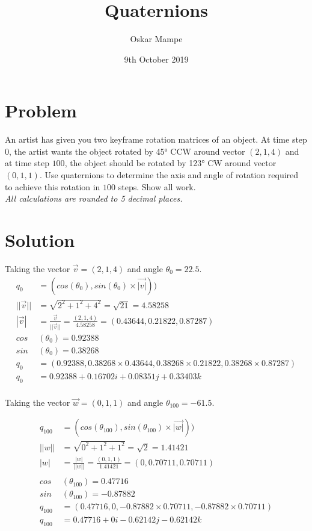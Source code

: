 \documentclass{article}
\author{Oskar Mampe}
\title{Quaternions}
\date{9th October 2019}
\begin{document}
\maketitle
\section*{Problem}
An artist has given you two keyframe rotation matrices of an object.  At time step $0$, the artist wants the object rotated by \ang{45} CCW around vector $(2,1,4)$ and at time step $100$, the object should be rotated by \ang{123} CW around vector $(0,1,1)$.
Use quaternions to determine the axis and angle of rotation required to achieve this rotation in $100$ steps.  Show all work.\\[1em]

\textit{All calculations are rounded to 5 decimal places.}

\section*{Solution}



Taking the vector $\vec{v} = (2,1,4)$ and angle $\theta_0 = 22.5$.
\begin{align*}
q_0 &= (cos(\theta_0), sin(\theta_0) \times \vec{|v|}))\\[1em]
||\vec{v}|| &= \sqrt{2^2 + 1^ 2 + 4^2}
= \sqrt{21} 
= 4.58258\\[1em]
%
|\vec{v}| &= 
\frac{\vec{v}}{||\vec{v}||} = 
\frac{(2, 1, 4)}{4.58258 }
= (0.43644, 0.21822, 0.87287)\\[1em]
%
cos&(\theta_0) = 0.92388\\[1em]
sin&(\theta_0) = 0.38268\\[1em]
q_0 &= (0.92388,0.38268 \times 0.43644, 0.38268 \times 0.21822, 0.38268 \times 0.87287)\\[1em]
q_0 &= 0.92388 + 0.16702i + 0.08351j + 0.33403k\\[1em]
\end{align*}

Taking the vector $\vec{w} = (0,1,1)$ and angle $\theta_{100} = -61.5$.

\begin{align*}
q_{100} &= (cos(\theta_{100}), sin(\theta_{100}) \times \vec{|w|}))\\[1em]
||w|| &= \sqrt{0^2 + 1^2 + 1^2} = \sqrt{2} = 1.41421\\[1em]
|w| &= \frac{|w|}{||w||} = \frac{(0,1,1)}{1.41421} = (0, 0.70711, 0.70711)\\[1em]
\\[1em]
cos&(\theta_{100}) = 0.47716\\[1em]
sin&(\theta_{100}) = -0.87882\\[1em]
q_{100} &= (0.47716, 0, -0.87882 \times 0.70711, -0.87882 \times 0.70711)\\[1em]
q_{100} &= 0.47716 + 0i -0.62142j -0.62142k\\[1em]
\end{align*}
\end{document}
